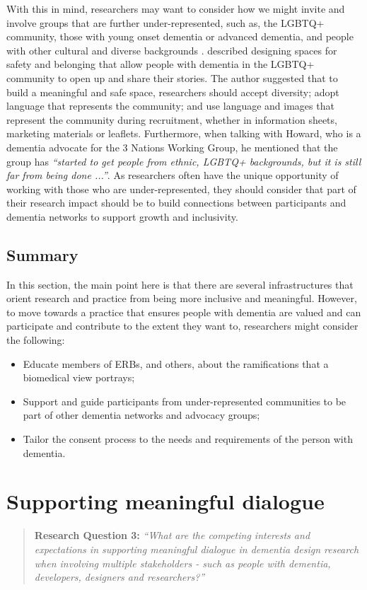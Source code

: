 With this in mind, researchers may want to consider how we might invite and involve groups that are further under-represented, such as, the LGBTQ+ community, those with young onset dementia or advanced dementia, and people with other cultural and diverse backgrounds \citep{foley_struggle_2019, bryden_before_2015}. \cite{mcgovern2014forgotten} described designing spaces for safety and belonging that allow people with dementia in the LGBTQ+ community to open up and share their stories. The author suggested that to build a meaningful and safe space, researchers should accept diversity; adopt language that represents the community; and use language and images that represent the community during recruitment, whether in information sheets, marketing materials or leaflets. Furthermore, when talking with Howard, who is a dementia advocate for the 3 Nations Working Group, he mentioned that the group has \textit{``started to get people from ethnic, LGBTQ+ backgrounds, but it is still far from being done ...''}. As researchers often have the unique opportunity of working with those who are under-represented, they should consider that part of their research impact should be to build connections between participants and dementia networks to support growth and inclusivity.

\subsection{Summary}
\label{EthicsSummary}
In this section, the main point here is that there are several infrastructures that orient research and practice from being more inclusive and meaningful. However, to move towards a practice that ensures people with dementia are valued and can participate and contribute to the extent they want to, researchers might consider the following:
\begin{itemize}
    \item Educate members of ERBs, and others, about the ramifications that a biomedical view portrays;
    \item Support and guide participants from under-represented communities to be part of other dementia networks and advocacy groups;
    \item Tailor the consent process to the needs and requirements of the person with dementia.
\end{itemize}

\section{Supporting meaningful dialogue}
\label{Discussion:RQ3}
\begin{quote}
\textbf{    Research Question 3:
}    
\textit{ “What are the competing interests and expectations in supporting meaningful dialogue in dementia design research when involving multiple stakeholders - such as people with dementia, developers, designers and researchers?”}
\end{quote}

